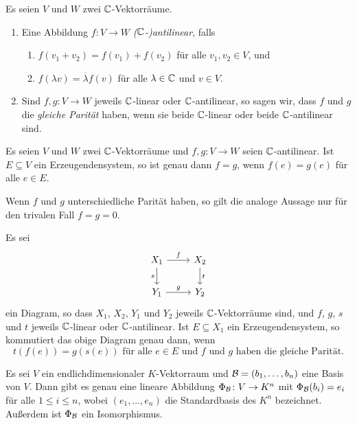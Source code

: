 \documentclass[a4paper,10pt]{article}
\begin{document}
\begin{definition}
  Es seien $V$ und $W$ zwei $\mathbb{C}$-Vektorräume.
  \begin{enumerate}[leftmargin=*]
    \item 
      Eine Abbildung $f \colon V \to W$ \emph{($\mathbb{C}$-)antilinear}, falls
      \begin{enumerate}
        \item
          $f(v_1 + v_2) = f(v_1) + f(v_2)$ für alle $v_1, v_2 \in V$, und
        \item
          $f(\lambda v) = \overline{\lambda} f(v)$ für alle $\lambda \in \mathbb{C}$ und $v \in V$.
      \end{enumerate}
    \item
      Sind $f, g \colon V \to W$ jeweils $\mathbb{C}$-linear oder $\mathbb{C}$-antilinear, so sagen wir, dass $f$ und $g$ die \emph{gleiche Parität} haben, wenn sie beide $\mathbb{C}$-linear oder beide $\mathbb{C}$-antilinear sind.
  \end{enumerate}
\end{definition}


\begin{lemma}
  Es seien $V$ und $W$ zwei $\mathbb{C}$-Vektorräume und $f, g \colon V \to W$ seien $\mathbb{C}$-antilinear.
  Ist $E \subseteq V$ ein Erzeugendensystem, so ist genau dann $f = g$, wenn $f(e) = g(e)$ für alle $e \in E$.
\end{lemma}


\begin{remark}
  Wenn $f$ und $g$ unterschiedliche Parität haben, so gilt die analoge Aussage nur für den trivalen Fall $f = g = 0$.
\end{remark}


\begin{corollary}
  Es sei
  \[
    \begin{tikzcd}
        X_1
        \arrow[r, "f"]
        \arrow[d, "s"']
      & X_2
        \arrow[d, "t"]
      \\
        Y_1
        \arrow[r, "g"]
      & Y_2
    \end{tikzcd}
  \]
  ein Diagram, so dass $X_1$, $X_2$, $Y_1$ und $Y_2$ jeweils $\mathbb{C}$-Vektorräume sind, und $f$, $g$, $s$ und $t$ jeweils $\mathbb{C}$-linear oder $\mathbb{C}$-antilinear.
  Ist $E \subseteq X_1$ ein Erzeugendensystem, so kommutiert das obige Diagram genau dann, wenn
  \[
    \text{$t(f(e)) = g(s(e))$ für alle $e \in E$ und $f$ und $g$ haben die gleiche Parität}.
  \]
\end{corollary}


\begin{lemma}
  Es sei $V$ ein endlichdimensionaler $K$-Vektorraum und $\mathcal{B} = (b_1, \dotsc, b_n)$ eine Basis von $V$.
  Dann gibt es genau eine lineare Abbildung $\Phi_{\mathcal{B}} \colon V \to K^n$ mit $\Phi_{\mathcal{B}}(b_i) = e_i$ für alle $1 \leq i \leq n$, wobei $(e_1, \dotsc, e_n)$ die Standardbasis des $K^n$ bezeichnet.
  Außerdem ist $\Phi_{\mathcal{B}}$ ein Isomorphismus.
\end{lemma}
\end{document}
